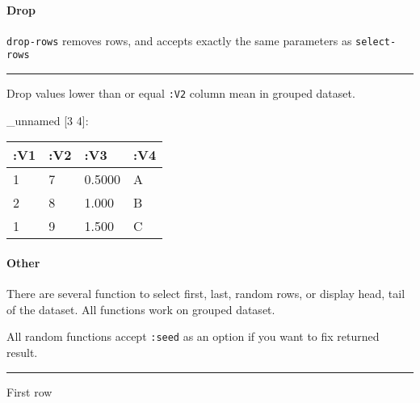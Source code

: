 \documentclass[]{article}
\newenvironment{Shaded}{\begin{snugshade}}{\end{snugshade}}
\newcommand{\KeywordTok}[1]{\textcolor[rgb]{0.13,0.29,0.53}{\textbf{#1}}}
\newcommand{\VariableTok}[1]{\textcolor[rgb]{0.00,0.00,0.00}{#1}}
\newcommand{\AttributeTok}[1]{\textcolor[rgb]{0.77,0.63,0.00}{#1}}
\newcommand{\NormalTok}[1]{#1}
\let\oldparagraph\paragraph
\renewcommand{\paragraph}[1]{\oldparagraph{#1}\mbox{}}
\begin{document}
\paragraph{Drop}\label{drop-1}

\texttt{drop-rows} removes rows, and accepts exactly the same parameters
as \texttt{select-rows}

\begin{center}\rule{0.5\linewidth}{0.5pt}\end{center}

Drop values lower than or equal \texttt{:V2} column mean in grouped
dataset.

\begin{Shaded}
\end{Shaded}

\_unnamed {[}3 4{]}:

\begin{longtable}[]{@{}llll@{}}
\toprule
:V1 & :V2 & :V3 & :V4\tabularnewline
\midrule
\endhead
1 & 7 & 0.5000 & A\tabularnewline
2 & 8 & 1.000 & B\tabularnewline
1 & 9 & 1.500 & C\tabularnewline
\bottomrule
\end{longtable}

\paragraph{Other}\label{other}

There are several function to select first, last, random rows, or
display head, tail of the dataset. All functions work on grouped
dataset.

All random functions accept \texttt{:seed} as an option if you want to
fix returned result.

\begin{center}\rule{0.5\linewidth}{0.5pt}\end{center}

First row
\end{document}
